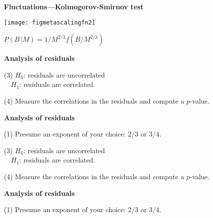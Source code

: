 {%




  \textbf{\small Fluctuations---Kolmogorov-Smirnov test}

  \begin{center}
    \texttt{[image: figmetascalingfn2]}

     $  P(B\, |M) = 1/M^{2/3} f(B/M^{2/3})$
  \end{center}


  \textbf{Analysis of residuals}


\inv



(3) $H_0$: residuals are uncorrelated\\
\ \ \quad $H_1$: residuals are correlated.

(4) Measure the correlations in the residuals
and compute a $p$-value.

\vis


  \textbf{Analysis of residuals}

(1) Presume an exponent of your choice: 2/3 or 3/4.



\inv

(3) $H_0$: residuals are uncorrelated\\
\ \ \quad $H_1$: residuals are correlated.

(4) Measure the correlations in the residuals
and compute a $p$-value.

\vis


  \textbf{Analysis of residuals}

(1) Presume an exponent of your choice: 2/3 or 3/4.

}
